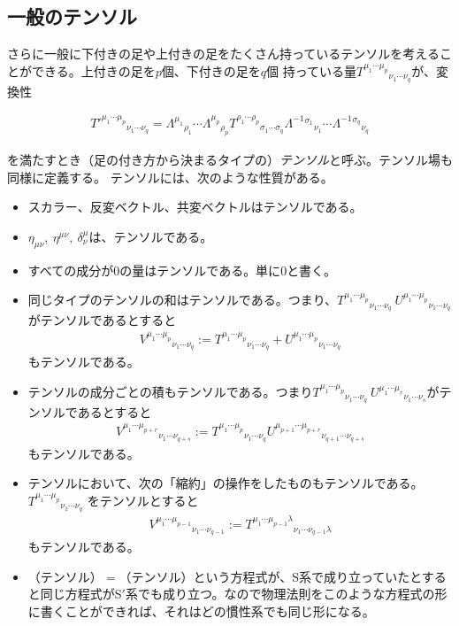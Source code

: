 \documentclass[report,paper=a4, fontsize=12pt, line_length=16cm, number_of_lines=33,dvipdfmx]{jlreq}
\newenvironment{important}{\begin{tcolorbox}[
  colback = white,
  colframe = red!35,
  boxrule = 2mm,
  fonttitle = \bfseries,
  after = \noindent] }{\end{tcolorbox}}
\numberwithin{equation}{chapter}
\newcommand{\Sp}{S$'$}
\begin{document}
\subsection{一般のテンソル}
さらに一般に下付きの足や上付きの足をたくさん持っているテンソルを考えることができる。上付きの足を$p$個、下付きの足を$q$個
持っている量$T^{\mu_{1}\cdots \mu_{p}}{}_{\nu_{1}\cdots \nu_{q}}$が、変換性
\begin{important}
  \begin{align}
   T'^{\mu_{1}\cdots \mu_{p}}{}_{\nu_{1}\cdots \nu_{q}}
   =
   \Lambda^{\mu_{1}}{}_{\rho_{1}} \cdots
   \Lambda^{\mu_{p}}{}_{\rho_{p}}
   T^{\rho_{1}\cdots \rho_{p}}{}_{\sigma_{1}\cdots \sigma_{q}}
   \Lambda^{-1}{}^{\sigma_{1}}{}_{\nu_{1}} \cdots
   \Lambda^{-1}{}^{\sigma_{q}}{}_{\nu_{q}}
  \end{align}
\end{important}
を満たすとき（足の付き方から決まるタイプの）\emph{テンソル}と呼ぶ。テンソル場も同様に定義する。
テンソルには、次のような性質がある。
\begin{itemize}
\item スカラー、反変ベクトル、共変ベクトルはテンソルである。
\item $\eta_{\mu\nu}, \ \eta^{\mu\nu},\ \delta^{\mu}_{\nu}$は、テンソルである。
\item すべての成分が$0$の量はテンソルである。単に$0$と書く。
\item 同じタイプのテンソルの和はテンソルである。つまり、$T^{\mu_{1}\cdots \mu_{p}}{}_{\nu_{1}\cdots \nu_{q}}\ U^{\mu_{1}\cdots \mu_{p}}{}_{\nu_{1}\cdots \nu_{q}}$ がテンソルであるとすると
\begin{align}
V^{\mu_{1}\cdots \mu_{p}}{}_{\nu_{1}\cdots \nu_{q}}
:=T^{\mu_{1}\cdots \mu_{p}}{}_{\nu_{1}\cdots \nu_{q}} + U^{\mu_{1}\cdots \mu_{p}}{}_{\nu_{1}\cdots \nu_{q}}
\end{align}
もテンソルである。
\item テンソルの成分ごとの積もテンソルである。つまり$T^{\mu_{1}\cdots \mu_{p}}{}_{\nu_{1}\cdots \nu_{q}}\ U^{\mu_{1}\cdots \mu_{r}}{}_{\nu_{1}\cdots \nu_{s}}$がテンソルであるとすると
\begin{align}
V^{\mu_{1}\cdots \mu_{p+r}}{}_{\nu_{1}\cdots \nu_{q+s}}:=
T^{\mu_{1}\cdots \mu_{p}}{}_{\nu_{1}\cdots \nu_{q}}U^{\mu_{p+1}\cdots \mu_{p+r}}{}_{\nu_{q+1}\cdots \nu_{q+s}}
\end{align}
もテンソルである。
\item テンソルにおいて、次の「縮約」の操作をしたものもテンソルである。$T^{\mu_{1}\cdots \mu_{p}}{}_{\nu_{1}\cdots \nu_{q}}$ をテンソルとすると
\begin{align}
V^{\mu_{1}\cdots \mu_{p-1}}{}_{\nu_{1}\cdots \nu_{q-1}}
:=T^{\mu_{1}\cdots \mu_{p-1}\lambda}{}_{\nu_{1}\cdots \nu_{q-1}\lambda}
\end{align}
もテンソルである。
\item （テンソル）$=$（テンソル）という方程式が、S系で成り立っていたとすると同じ方程式が\Sp 系でも成り立つ。なので物理法則をこのような方程式の形に書くことができれば、それはどの慣性系でも同じ形になる。
\end{itemize}
\end{document}
